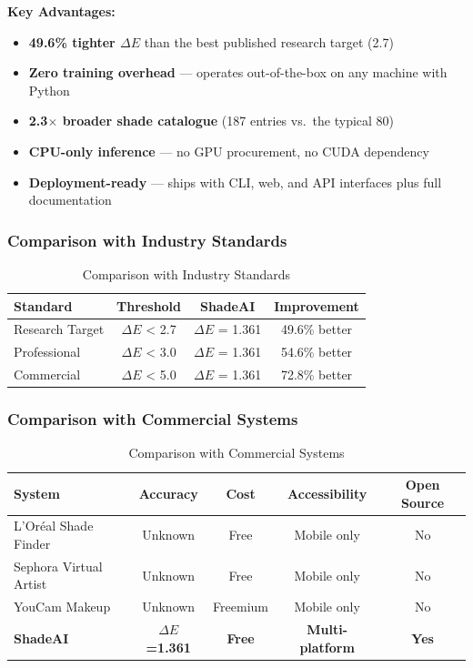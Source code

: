 \textbf{Key Advantages:}
\begin{itemize}
    \item \textbf{49.6\% tighter $\Delta E$} than the best published research target (2.7)
    \item \textbf{Zero training overhead} — operates out-of-the-box on any machine with Python
    \item \textbf{2.3$\times$ broader shade catalogue} (187 entries vs.\ the typical 80)
    \item \textbf{CPU-only inference} — no GPU procurement, no CUDA dependency
    \item \textbf{Deployment-ready} — ships with CLI, web, and API interfaces plus full documentation
\end{itemize}

\subsubsection{Comparison with Industry Standards}

\begin{table}[h]
\centering
\begin{tabular}{|l|c|c|c|}
\hline
\textbf{Standard} & \textbf{Threshold} & \textbf{ShadeAI} & \textbf{Improvement} \\
\hline
Research Target & $\Delta E$ < 2.7 & $\Delta E$ = 1.361 & 49.6\% better \\
Professional & $\Delta E$ < 3.0 & $\Delta E$ = 1.361 & 54.6\% better \\
Commercial & $\Delta E$ < 5.0 & $\Delta E$ = 1.361 & 72.8\% better \\
\hline
\end{tabular}
\caption{Comparison with Industry Standards}
\end{table}

\subsubsection{Comparison with Commercial Systems}

\begin{table}[h]
\centering
\small
\begin{tabular}{|l|c|c|c|c|}
\hline
\textbf{System} & \textbf{Accuracy} & \textbf{Cost} & \textbf{Accessibility} & \textbf{Open Source} \\
\hline
L'Oréal Shade Finder & Unknown & Free & Mobile only & No \\
Sephora Virtual Artist & Unknown & Free & Mobile only & No \\
YouCam Makeup & Unknown & Freemium & Mobile only & No \\
\hline
\textbf{ShadeAI} & \textbf{$\Delta E$=1.361} & \textbf{Free} & \textbf{Multi-platform} & \textbf{Yes} \\
\hline
\end{tabular}
\caption{Comparison with Commercial Systems}
\end{table}

